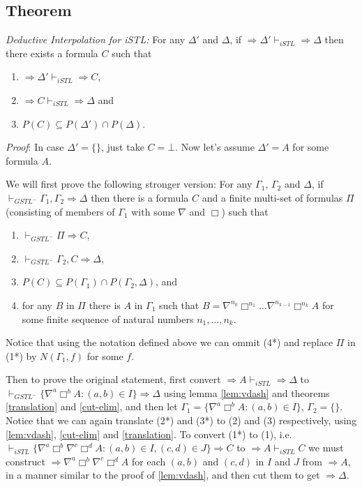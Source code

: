 \subsection{Theorem} \textit{Deductive Interpolation for iSTL: } For any $\Delta'$ and $\Delta$, if $\Rightarrow \Delta' \vdash_{iSTL} \Rightarrow \Delta$ then there exists a formula $C$ such that
\begin{enumerate}[label=(\arabic*)]
	\item $\Rightarrow \Delta' \vdash_{iSTL} \Rightarrow C$,
	\item $\Rightarrow C \vdash_{iSTL} \Rightarrow \Delta$ and
	\item $P(C) \subseteq P(\Delta') \cap P(\Delta)$.
\end{enumerate}

\textit{Proof}: In case $\Delta' = \{\}$, just take $C = \bot$. Now let's assume $\Delta' = A$ for some formula $A$.

We will first prove the following stronger version: For any $\Gamma_1$, $\Gamma_2$ and $\Delta$, if $\vdash_{GSTL^-} \Gamma_1 , \Gamma_2 \Rightarrow \Delta$ then there is a formula $C$ and a finite multi-set of formulas $\Pi$ (consisting of members of $\Gamma_1$ with some $\nabla$ and $\Box$) such that
\begin{enumerate}[label=(\arabic**)]
	\item $\vdash_{GSTL^-} \Pi \Rightarrow C$,
	\item $\vdash_{GSTL^-} \Gamma_2 , C \Rightarrow \Delta$,
	\item $P(C) \subseteq P(\Gamma_1) \cap P(\Gamma_2,\Delta)$, and
	\item for any $B$ in $\Pi$ there is $A$ in $\Gamma_1$ such that $B = \nabla^{n_0} \Box^{n_1} \dots \nabla^{n_{k-1}} \Box^{n_k} A$ for some finite sequence of natural numbers $n_1,...,n_k$.
\end{enumerate}
Notice that using the notation defined above we can ommit (4*) and replace $\Pi$ in (1*) by $N(\Gamma_1, f)$ for some $f$.

Then to prove the original statement, first convert $\Rightarrow A \vdash_{iSTL} \Rightarrow \Delta$ to $\vdash_{GSTL^-} \{\nabla^a\Box^b A : (a,b) \in I\} \Rightarrow \Delta$ using lemma \ref{lem:vdash} and theorems \ref{translation} and \ref{cut-elim}, and then let $\Gamma_1 = \{\nabla^a \Box^b A : (a,b) \in I \}$, $\Gamma_2 = \{\}$. Notice that we can again translate (2*) and (3*) to (2) and (3) respectively, using \ref{lem:vdash}, \ref{cut-elim} and \ref{translation}. To convert (1*) to (1), i.e. $\vdash_{iSTL} \{\nabla^a \Box^b \nabla^c \Box^d A : (a,b) \in I , (c,d) \in J \} \Rightarrow C$ to $\Rightarrow A \vdash_{iSTL} C$ we must construct $\Rightarrow \nabla^a \Box^b \nabla^c \Box^d A$ for each $(a,b)$ and $(c,d)$ in $I$ and $J$ from $\Rightarrow A$, in a manner similar to the proof of \ref{lem:vdash}, and then cut them to get $\Rightarrow \Delta$.

